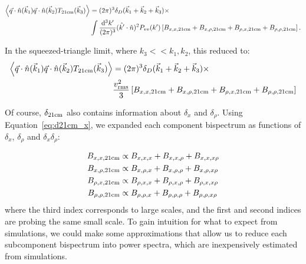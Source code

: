 \begin{equation}
\begin{split}
\left\langle \vec{q} \cdot \hat{n}(\vec{k}_1) \vec{q} \cdot \hat{n} (\vec{k}_2) T_{\rm 21cm}(\vec{k}_3) \right\rangle &= 
(2\pi)^3 \delta_D(\vec{k}_1 + \vec{k}_2 + \vec{k}_3) \times \\
& \int \frac{{\rm d^3}k'}{(2\pi)^3} (\hat{k'}\cdot\hat{n})^2 P_{vv}(k') 
\left[ B_{x,x,\rm 21cm} + B_{x,\rho,\rm 21cm} + B_{\rho,x,\rm 21cm} +B_{\rho,\rho,\rm 21cm} \right].
\end{split}
\end{equation}

In the squeezed-triangle limit, where $k_3 << k_1,k_2$, this reduced to:
\begin{equation}
\begin{split}
\left\langle \vec{q} \cdot \hat{n}(\vec{k}_1) \vec{q} \cdot \hat{n} (\vec{k}_2) T_{{\rm 21cm}}(\vec{k}_3) \right\rangle &= 
(2\pi)^3 \delta_D(\vec{k}_1 + \vec{k}_2 + \vec{k}_3) \times \\
& \frac{v_{\rm rms}^2}{3} 
\left[ B_{x,x,{\rm 21cm}} + B_{x,\rho,{\rm 21cm}} + B_{\rho,x,{\rm 21cm}} +B_{\rho,\rho,{\rm 21cm}} \right]
\end{split}
\label{eq:component_bispectra}
\end{equation}

Of course, $\delta_{\rm 21cm}$ also contains information about $\delta_x$ and $\delta_{\rho}$. Using Equation~\ref{eq:d21cm_x}, we expanded each component bispectrum as functions of $\delta_x$, $\delta_{\rho}$ and $\delta_x\delta_{\rho}$:

\begin{equation}
\begin{split}
B_{x,x,{\rm 21cm}} &\propto B_{x,x,x} + B_{x,x,\rho} + B_{x,x,x\rho}\\
B_{x,\rho,{\rm 21cm}} &\propto B_{x,\rho,x} + B_{x,\rho,\rho} + B_{x,\rho,x\rho}\\
B_{\rho,x,{\rm 21cm}} &\propto B_{\rho,x,x} + B_{\rho,x,\rho} + B_{\rho,x,x\rho}\\
B_{\rho,\rho,{\rm 21cm}} &\propto B_{\rho,\rho,x} + B_{\rho,\rho,\rho} + B_{\rho,\rho,x\rho}\\
\end{split}
\label{eq:lots_of_bispectra}
\end{equation}
where the third index corresponds to large scales, and the first and second indices are probing the same small scale. To gain intuition for what to expect from simulations, we could make some approximations that allow us to reduce each subcomponent bispectrum into power spectra, which are inexpensively estimated from simulations.

